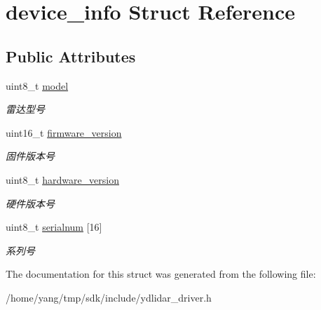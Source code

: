 \hypertarget{structdevice__info}{}\section{device\+\_\+info Struct Reference}
\label{structdevice__info}
\subsection*{Public Attributes}
\begin{DoxyCompactItemize}
\item 
uint8\+\_\+t \hyperlink{structdevice__info_a3c491b342ed11af3c70358e7e8f6c935}{model}\hypertarget{structdevice__info_a3c491b342ed11af3c70358e7e8f6c935}{}\label{structdevice__info_a3c491b342ed11af3c70358e7e8f6c935}

\begin{DoxyCompactList}\small\item\em 雷达型号 \end{DoxyCompactList}\item 
uint16\+\_\+t \hyperlink{structdevice__info_af3d369a410577d85ec6b59ffeeaade48}{firmware\+\_\+version}\hypertarget{structdevice__info_af3d369a410577d85ec6b59ffeeaade48}{}\label{structdevice__info_af3d369a410577d85ec6b59ffeeaade48}

\begin{DoxyCompactList}\small\item\em 固件版本号 \end{DoxyCompactList}\item 
uint8\+\_\+t \hyperlink{structdevice__info_add77e9b0edbc4a0dbd8f91b0cac9ea13}{hardware\+\_\+version}\hypertarget{structdevice__info_add77e9b0edbc4a0dbd8f91b0cac9ea13}{}\label{structdevice__info_add77e9b0edbc4a0dbd8f91b0cac9ea13}

\begin{DoxyCompactList}\small\item\em 硬件版本号 \end{DoxyCompactList}\item 
uint8\+\_\+t \hyperlink{structdevice__info_abf23e35480aff36d846085ca6fd0eec3}{serialnum} \mbox{[}16\mbox{]}\hypertarget{structdevice__info_abf23e35480aff36d846085ca6fd0eec3}{}\label{structdevice__info_abf23e35480aff36d846085ca6fd0eec3}

\begin{DoxyCompactList}\small\item\em 系列号 \end{DoxyCompactList}\end{DoxyCompactItemize}


The documentation for this struct was generated from the following file\+:\begin{DoxyCompactItemize}
\item 
/home/yang/tmp/sdk/include/ydlidar\+\_\+driver.\+h\end{DoxyCompactItemize}
